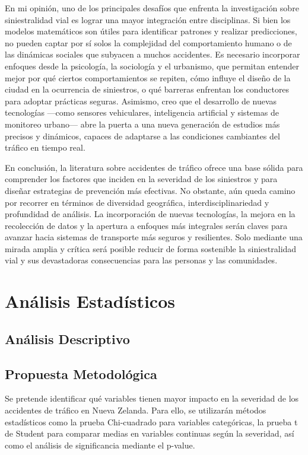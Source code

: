 \documentclass{book}
\begin{document}
En mi opinión, uno de los principales desafíos que enfrenta la investigación sobre siniestralidad vial es lograr una mayor integración entre disciplinas. Si bien los modelos matemáticos son útiles para identificar patrones y realizar predicciones, no pueden captar por sí solos la complejidad del comportamiento humano o de las dinámicas sociales que subyacen a muchos accidentes. Es necesario incorporar enfoques desde la psicología, la sociología y el urbanismo, que permitan entender mejor por qué ciertos comportamientos se repiten, cómo influye el diseño de la ciudad en la ocurrencia de siniestros, o qué barreras enfrentan los conductores para adoptar prácticas seguras. Asimismo, creo que el desarrollo de nuevas tecnologías ---como sensores vehiculares, inteligencia artificial y sistemas de monitoreo urbano--- abre la puerta a una nueva generación de estudios más precisos y dinámicos, capaces de adaptarse a las condiciones cambiantes del tráfico en tiempo real.

En conclusión, la literatura sobre accidentes de tráfico ofrece una base sólida para comprender los factores que inciden en la severidad de los siniestros y para diseñar estrategias de prevención más efectivas. No obstante, aún queda camino por recorrer en términos de diversidad geográfica, interdisciplinariedad y profundidad de análisis. La incorporación de nuevas tecnologías, la mejora en la recolección de datos y la apertura a enfoques más integrales serán claves para avanzar hacia sistemas de transporte más seguros y resilientes. Solo mediante una mirada amplia y crítica será posible reducir de forma sostenible la siniestralidad vial y sus devastadoras consecuencias para las personas y las comunidades.

\section{Análisis Estadísticos}
\subsection{Análisis Descriptivo}

\subsection{Propuesta Metodológica}
Se pretende identificar qué variables tienen mayor impacto en la severidad de los accidentes de tráfico en Nueva Zelanda. Para ello, se utilizarán métodos estadísticos como la prueba Chi-cuadrado para variables categóricas, la prueba t de Student para comparar medias en variables continuas según la severidad, así como el análisis de significancia mediante el p-value. 
\end{document}
